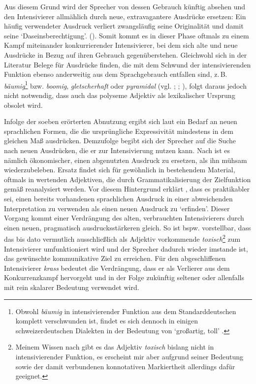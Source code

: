 \noindent Aus diesem Grund wird der Sprecher von dessen Gebrauch künftig absehen und den Intensivierer allmählich durch neue, extravagantere Ausdrücke ersetzen: \glqq{}Ein häufig verwendeter Ausdruck verliert zwangsläufig seine Originalität und damit seine `Daseinsberechtigung'.\grqq{} {(\citealt[190f.]{Kirschbaum.2002b})}. Somit kommt es in dieser Phase oftmals zu einem Kampf miteinander konkurrierender Intensivierer, bei dem sich alte und neue Ausdrücke in Bezug auf ihren Gebrauch gegenüberstehen. Gleichwohl sich in der Literatur Belege für Ausdrücke finden, die mit dem Schwund der intensivierenden Funktion ebenso anderweitig aus dem Sprachgebrauch entfallen sind, z.\,B. \textit{bäumig}\footnote{Obwohl \textit{bäumig} in intensivierender Funktion aus dem Standarddeutschen komplett verschwunden ist, findet es sich dennoch in einigen schweizerdeutschen Dialekten in der Bedeutung von `großartig, toll' \citep[vgl.][18]{Bickel.2012}.} bzw. \textit{boomig}, \textit{gletscherhaft} oder \textit{pyramidal} (vgl. {\citealt[135]{Tobler.1868}}; {\citealt[7f.]{Mueller.1899}}; {\citealt[268]{Becher.1907}}), folgt daraus jedoch nicht notwendig, dass auch das polyseme Adjektiv als lexikalischer Ursprung {obsolet wird}.


Infolge der soeben erörterten Abnutzung ergibt sich laut {\citet[274]{Baumgarten.1908}} ein Bedarf an neuen sprachlichen Formen, die die ursprüngliche Expressivität mindestens in dem gleichen Maß ausdrücken. Demzufolge begibt sich der Sprecher auf die Suche nach neuen Ausdrücken, die er zur Intensivierung nutzen kann. Nach {\citet[95]{Dahl.2001}} ist es nämlich ökonomischer, einen abgenutzten Ausdruck zu ersetzen, als ihn mühsam wiederzubeleben. Ersatz findet sich für gewöhnlich in bestehendem Material, oftmals in wertenden Adjektiven, die durch Grammatikalisierung der Zielfunktion gemäß reanalysiert werden. Vor diesem Hintergrund erklärt \citet[188]{Kirschbaum.2002b}, dass es praktikabler sei, \glqq{}einen bereits vorhandenen sprachlichen Ausdruck in einer abweichenden Interpretation zu verwenden als einen neuen Ausdruck zu `erfinden'.\grqq{} Dieser Vorgang kommt einer Verdrängung des alten, verbrauchten Intensivierers durch einen neuen, pragmatisch ausdrucksstärkeren gleich. So ist bspw. vorstellbar, dass das bis dato vermutlich ausschließlich als Adjektiv vorkommende \textit{toxisch}\footnote{Meinem Wissen nach gibt es das Adjektiv \textit{toxisch} bislang nicht in intensivierender Funktion, es erscheint mir aber aufgrund seiner Bedeutung sowie der damit verbundenen konnotativen Markiertheit allerdings dafür geeignet.} zum Intensivierer umfunktioniert wird und der Sprecher dadurch wieder imstande ist, das gewünschte kommunikative Ziel zu erreichen. Für den abgeschliffenen Intensivierer \textit{krass} bedeutet die Verdrängung, dass er als Verlierer aus dem Konkurrenzkampf hervorgeht und in der Folge zukünftig seltener oder allenfalls mit rein skalarer Bedeutung verwendet wird.

